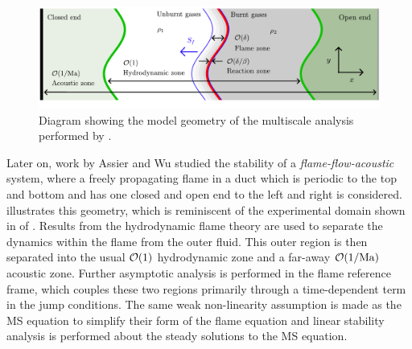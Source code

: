 



\begin{figure}[t]
\centering
\includegraphics[scale=0.6]{assets/imgs/AW-flame.pdf}
\caption{Diagram showing the model geometry of the multiscale analysis performed by \cite{assier2014LinearWeaklyNonlinear}.}
\label{fig:AW-flame}
\end{figure}

Later on, work by Assier and Wu \cite{assier2014LinearWeaklyNonlinear} studied the stability of a \emph{flame-flow-acoustic} system, where a freely propagating flame in a duct which is periodic to the top and bottom and has one closed and open end to the left and right is considered.  illustrates this geometry, which is reminiscent of the experimental domain shown in  of \cite{searby1992AcousticInstabilityPremixed}. Results from the hydrodynamic flame theory \cite{matalon1982FlamesGasdynamicDiscontinuities} are used to separate the dynamics within the flame from the outer fluid. This outer region is then separated into the usual $\mathcal{O}(1)$ hydrodynamic zone and a far-away $\mathcal{O}(1/\mathrm{Ma})$ acoustic zone. Further asymptotic analysis is performed in the flame reference frame, which couples these two regions primarily through a time-dependent term in the jump conditions. The same weak non-linearity assumption is made as the MS equation to simplify their form of the flame equation and linear stability analysis is performed about the steady solutions to the MS equation.

